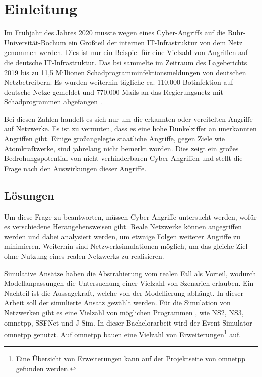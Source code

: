 \chapter{Einleitung}\label{chap:einleitung1}
Im Frühjahr des Jahres 2020 musste wegen eines Cyber-Angriffs auf die Ruhr-Universität-Bochum \cite{RUBHH} ein Großteil der internen IT-Infrastruktur von dem Netz genommen werden. Dies ist nur ein Beispiel für eine Vielzahl von Angriffen auf die deutsche IT-Infrastruktur. Das \gls{bsi} sammelte im Zeitraum des Lageberichts 2019 bis zu 11,5 Millionen Schadprogramminfektionsmeldungen von deutschen Netzbetreibern. Es wurden weiterhin tägliche {ca.} 110.000 Botinfektion auf deutsche Netze gemeldet und 770.000 Mails an das Regierungsnetz mit Schadprogrammen abgefangen \cite[]{BSILage}.

Bei diesen Zahlen handelt es sich nur um die erkannten oder vereitelten Angriffe auf Netzwerke. Es ist zu vermuten, dass es eine hohe Dunkelziffer \cite{BKA19} an unerkannten Angriffen gibt. Einige großangelegte staatliche Angriffe, gegen Ziele wie Atomkraftwerke, sind jahrelang nicht bemerkt \cite[]{Monte2015} worden. Dies zeigt ein großes Bedrohungspotential von nicht verhinderbaren Cyber-Angriffen und stellt die Frage nach den Auswirkungen dieser Angriffe.

\section{Lösungen}
Um diese Frage zu beantworten, müssen Cyber-Angriffe untersucht werden, wofür es verschiedene Herangehensweisen gibt. Reale Netzwerke können angegriffen werden und dabei analysiert werden, um etwaige Folgen weiterer Angriffe zu minimieren. Weiterhin sind Netzwerksimulationen möglich, um das gleiche Ziel ohne Nutzung eines realen Netzwerks zu realisieren.

Simulative Ansätze haben die Abstrahierung vom realen Fall als Vorteil, wodurch Modellanpassungen die Untersuchung einer Vielzahl von Szenarien erlauben. Ein Nachteil ist die Aussagekraft, welche von der Modellierung abhängt. In dieser Arbeit soll der simulierte Ansatz gewählt werden. Für die Simulation von Netzwerken gibt es eine Vielzahl von möglichen Programmen \cite{SimOverview}, wie NS2, NS3, \gls{omnetpp}, SSFNet und J-Sim. In dieser Bachelorarbeit wird der Event-Simulator \gls{omnetpp} genutzt. Auf \gls{omnetpp} bauen eine Vielzahl von Erweiterungen\footnote{Eine Übersicht von Erweiterungen kann auf der \href{https://omnetpp.org/download/models-and-tools}{Projektseite} von \gls{omnetpp} gefunden werden.} auf. 

